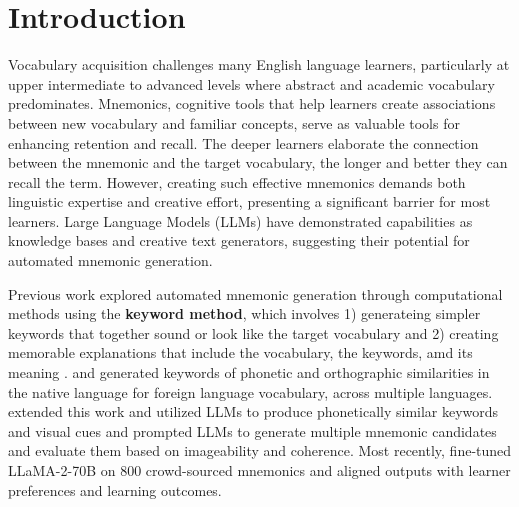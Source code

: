 
\section{Introduction}
Vocabulary acquisition challenges many English language learners, particularly at upper intermediate to advanced levels where abstract and academic vocabulary predominates. Mnemonics, cognitive tools that help learners create associations between new vocabulary and familiar concepts, serve as valuable tools for enhancing retention and recall. The deeper learners elaborate the connection between the mnemonic and the target vocabulary, the longer and better they can recall the term. However, creating such effective mnemonics demands both linguistic expertise and creative effort, presenting a significant barrier for most learners. Large Language Models (LLMs) have demonstrated capabilities as knowledge bases and creative text generators, suggesting their potential for automated mnemonic generation.

Previous work explored automated mnemonic generation through computational methods using the \textbf{keyword method}, which involves 1) generateing simpler keywords that together sound or look like the target vocabulary and 2) creating memorable explanations that include the vocabulary, the keywords, amd its meaning \citep{atkinsonApplicationMnemonicKeyword1975}. \citet{savvaTransPhonerAutomatedMnemonic2014} and \citet{OzbalAUTOMATION2014} generated keywords of phonetic and orthographic similarities in the native language for foreign language vocabulary, across multiple languages. \citet{LeeSMARTPHONE2023} extended this work and utilized LLMs to produce phonetically similar keywords and visual cues and \citet{LeeEXPLORING2024} prompted LLMs to generate multiple mnemonic candidates and evaluate them based on imageability and coherence. Most recently, \citet{balepurSMART2024} fine-tuned LLaMA-2-70B on 800 crowd-sourced mnemonics and aligned outputs with learner preferences and learning outcomes.


